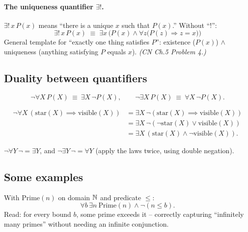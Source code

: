 \paragraph{The uniqueness quantifier $\exists!$.} $\exists!\,x\,P(x)$
means ``there is a unique $x$ such that $P(x)$.'' Without ``$!$'':
\[
\exists!\,x\,P(x) \;\equiv\; \exists x\,\Big(P(x)\wedge\forall z\big(P(z)\Rightarrow z=x\big)\Big)
\]
General template for ``exactly one thing satisfies $P$'':
existence ($P(x)$) $\wedge$ uniqueness (anything satisfying $P$
equals $x$). \emph{(CN Ch.5 Problem 4.)}

\subsection{Duality between quantifiers}
\label{sec:5-13}

\begin{theorem}
\[
\neg\forall X\, P(X) \ \equiv\ \exists X\,\neg P(X), \qquad \neg\exists X\, P(X) \ \equiv\ \forall X\,\neg P(X).
\]
\end{theorem}

\begin{example}[``Not all stars are visible'' $=$ ``some star is invisible'']
\begin{align*}
\neg\forall X\,(\mathrm{star}(X)\implies\mathrm{visible}(X))
&= \exists X\,\neg(\mathrm{star}(X)\implies\mathrm{visible}(X)) \\
&= \exists X\,\neg(\neg\mathrm{star}(X)\vee\mathrm{visible}(X)) \\
&= \exists X\,(\mathrm{star}(X)\wedge\neg\mathrm{visible}(X)).
\end{align*}
\end{example}

\begin{note}
$\neg\forall Y\,\neg = \exists Y$, and $\neg\exists Y\,\neg = \forall Y$ (apply the laws twice, using double negation).
\end{note}

\subsection{Some examples}
\label{sec:5-15}

\begin{example}
With $\mathrm{Prime}(n)$ on domain $\mathbb{N}$ and predicate $\le$:
\[
\forall b\, \exists n\ \mathrm{Prime}(n) \wedge \neg(n \le b).
\]
Read: for every bound $b$, some prime exceeds it -- correctly capturing ``infinitely many primes'' without needing an infinite conjunction.
\end{example}

